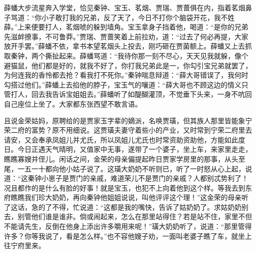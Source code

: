 \documentclass[12pt,oneside]{book}
\begin{document}
薛蟠大步流星奔入学堂，恰见秦钟、宝玉、茗烟、贾瑞、贾蔷俱在内，指着茗烟鼻子骂道：“你小子敢打我的兄弟，反了天了，今日不打你个脑袋开花，我不姓薛。”上来便要打人，茗烟唬的躲到墙角。宝玉拿身子挡着他，喝道：“是你的兄弟先滋衅撩事，不可鲁莽。”贾瑞、贾蔷笑着上前拉劝，道：“过去了何必再提，大家放开手罢。”薛蟠不依，拿书本望茗烟头上投去，刚巧砸在贾菌额上。薛蟠又上去抓取秦钟，两个撕扯起来。薛蟠骂道：“我待你那一刻不尽心，天天见我就躲，像个避猫鼠，他们都是好的，就我不好了，你打我兄弟此是一，你勾引宝兄弟就罢了，为何连我的香怜都去抢？看我打不死你。”秦钟喘息辩道：“薛大哥错误了，我何时勾搭过他们。”薛蟠上去掐他的脖子，宝玉气的嚷道：“薛大哥也不顾这边的情义只管打人，回去我告诉宝姐姐去。”薛蟠听了如醍醐灌顶，不觉垂下头来，一身不吭回自己座位上坐了。大家都东张西望不敢言语。　

且说金荣姑妈，原聘给的是贾家玉字辈的嫡派，名唤贾璜，但其族人那里皆能象宁荣二府的富势？原不用细说。这贾璜夫妻守着些小的产业，又时常到宁荣二府里去请安，又会奉承凤姐儿并尤氏，所以凤姐儿尤氏也时常资助资助他，方能如此度日。今日正遇天气晴明，又值家中无事，遂带了一个婆子，坐上车，来家里走走，瞧瞧寡嫂并侄儿。闲话之间，金荣的母亲偏提起昨日贾家学房里的那事，从头至尾，一五一十都向他小姑子说了。这璜大奶奶不听则已，听了一时怒从心上起，说道：“这秦钟小崽子是贾门的亲戚，难道荣儿不是贾门的亲戚？人都别忒势利了！况且都作的是什么有脸的好事！就是宝玉，也犯不上向着他到这个样。等我去到东府瞧瞧我们珍大奶奶，再向秦钟他姐姐说说，叫他评评这个理！”这金荣的母亲听了这话，急的了不得，忙说道：“这都是我的嘴快，告诉了姑奶奶了。求姑奶奶别去，别管他们谁是谁非。倘或闹起来，怎么在那里站得住？若是站不住，家里不但不能请先生，反倒在他身上添出许多嚼用来呢！”璜大奶奶听了，说道：“那里管得许多？你等我说了，看是怎么样。”也不容他嫂子劝，一面叫老婆子瞧了车，就坐上往宁府里来。
\end{document}
